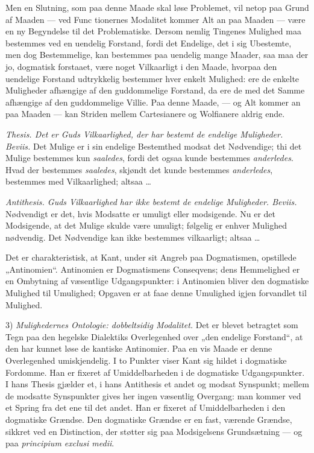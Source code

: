 \documentclass[12pt]{book}
\newcommand{\opage}[1]{\marginnote{\footnotesize\textit{[#1]}}}
\begin{document}
Men en Slutning, som paa denne Maade skal løse Problemet, vil netop paa Grund af Maaden --- ved Func%
\opage{234}tionernes Modalitet kommer Alt an paa Maaden --- være en ny Begyndelse til det Problematiske. Dersom nemlig Tingenes Mulighed maa bestemmes ved en uendelig Forstand, fordi det Endelige, det i sig Ubestemte, men dog Bestemmelige, kan bestemmes paa uendelig mange Maader, saa maa der jo, dogmatisk forstaaet, være noget Vilkaarligt i den Maade, hvorpaa den uendelige Forstand udtrykkelig bestemmer hver enkelt Mulighed: ere de enkelte Muligheder afhængige af den guddommelige Forstand, da ere de med det Samme afhængige af den guddommelige Villie. Paa denne Maade, --- og Alt kommer an paa Maaden --- kan Striden mellem Cartesianere og Wolfianere aldrig ende.

\emph{Thesis. Det er Guds Vilkaarlighed, der har bestemt de endelige Muligheder. Beviis.} Det Mulige er i sin endelige Bestemthed modsat det Nødvendige; thi det Mulige bestemmes kun \emph{saaledes}, fordi det ogsaa kunde bestemmes \emph{anderledes}. Hvad der bestemmes \emph{saaledes}, skjøndt det kunde bestemmes \emph{anderledes}, bestemmes med Vilkaarlighed; altsaa \dots

\emph{Antithesis. Guds Vilkaarlighed har ikke bestemt de endelige Muligheder. Beviis.} Nødvendigt er det, hvis Modsatte er umuligt eller modsigende. Nu er det Modsigende, at det Mulige skulde være umuligt; følgelig er enhver Mulighed nødvendig. Det Nødvendige kan ikke bestemmes vilkaarligt; altsaa \dots

Det er charakteristisk, at Kant, under sit Angreb paa Dogmatismen, opstillede „Antinomien“. Antinomien er Dogmatismens Conseqvens; dens Hemmelighed er en Ombytning af væsentlige Udgangspunkter: i Antinomien bliver den dogmatiske Mulighed til Umulighed; Opgaven er at faae denne Umulighed igjen forvandlet til Mulighed.

3) \emph{Mulighedernes Ontologie: dobbeltsidig Modalitet.} Det er blevet betragtet som Tegn paa den hegelske Dialektiks Overlegenhed over „den endelige Forstand“, at den
\opage{235}har kunnet løse de kantiske Antinomier. Paa en vis Maade er denne Overlegenhed umiskjendelig. I to Punkter viser Kant sig hildet i dogmatiske Fordomme. Han er fixeret af Umiddelbarheden i de dogmatiske Udgangspunkter. I hans Thesis gjælder et, i hans Antithesis et andet og modsat Synspunkt; mellem de modsatte Synspunkter gives her ingen væsentlig Overgang: man kommer ved et Spring fra det ene til det andet. Han er fixeret af Umiddelbarheden i den dogmatiske Grændse. Den dogmatiske Grændse er en fast, værende Grændse, sikkret ved en Distinction, der støtter sig paa Modsigelsens Grundsætning --- og paa \textit{principium exclusi medii}.
\end{document}
